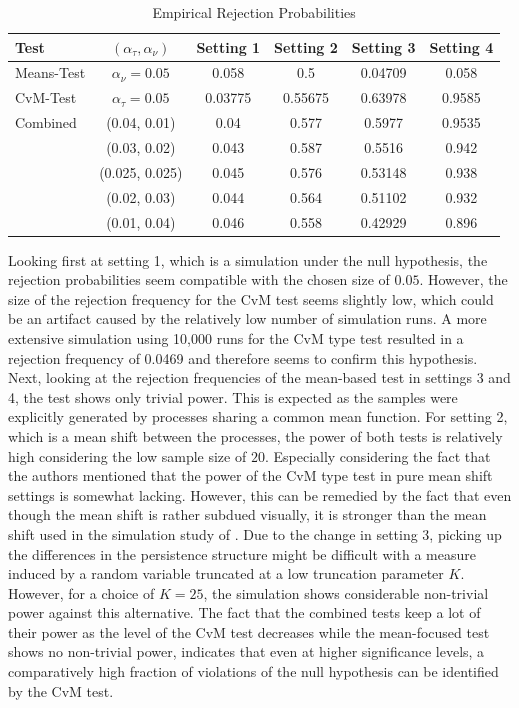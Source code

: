\documentclass[12pt, a4paper]{article}
\theoremstyle{MAstyle} \newtheorem{assumption}{Assumption}[section]
\theoremstyle{MAstyle} \newtheorem{definition}{Definition}[section]
\theoremstyle{MAstyle} \newtheorem{theorem}{Theorem}[section]
\begin{document}
		\begin{table}[H]
			\centering
			\begin{tabular}{l|c|cccc}\toprule
				\textbf{Test}	&$\left(\alpha_{\tau}, \alpha_{\nu}\right) $ &\textbf{Setting 1} &\textbf{Setting 2}	&\textbf{Setting 3} &\textbf{Setting 4}\\
				\midrule
				Means-Test		&$\alpha_{\nu} = 0.05$	& 0.058		& 0.5  	 	& 0.04709	& 0.058 	\\
				CvM-Test 		&$\alpha_{\tau} = 0.05$	& 0.03775	& 0.55675  	& 0.63978 	& 0.9585	\\
				\midrule	
				Combined		& (0.04, 0.01)			& 0.04		& 0.577  	& 0.5977 	& 0.9535	\\
								& (0.03, 0.02)			& 0.043		& 0.587  	& 0.5516 	& 0.942 	\\
								& (0.025, 0.025)		& 0.045		& 0.576  	& 0.53148 	& 0.938		\\
								& (0.02, 0.03)			& 0.044		& 0.564  	& 0.51102 	& 0.932		\\
								& (0.01, 0.04)			& 0.046		& 0.558  	& 0.42929 	& 0.896		\\
				\bottomrule
			\end{tabular}
			\caption{Empirical Rejection Probabilities}
		\end{table}
		Looking first at setting 1, which is a simulation under the null hypothesis, the rejection probabilities seem compatible with the chosen size of $0.05$. However, the size of the rejection frequency for the CvM test seems slightly low, which could be an artifact caused by the relatively low number of simulation runs. A more extensive simulation using 10,000 runs for the CvM type test resulted in a rejection frequency of 0.0469 and therefore seems to confirm this hypothesis.
		Next, looking at the rejection frequencies of the mean-based test in settings 3 and 4, the test shows only trivial power. This is expected as the samples were explicitly generated by processes sharing a common mean function. 
		For setting 2, which is a mean shift between the processes, the power of both tests is relatively high considering the low sample size of $20$. Especially considering the fact that the authors mentioned that the power of the CvM type test in pure mean shift settings is somewhat lacking. However, this can be remedied by the fact that even though the mean shift is rather subdued visually, it is stronger than the mean shift used in the simulation study of \cite{bugni_permutation_2021}.
		Due to the change in setting 3, picking up the differences in the persistence structure might be difficult with a measure induced by a random variable truncated at a low truncation parameter $K$. However, for a choice of $K = 25$, the simulation shows considerable non-trivial power against this alternative. The fact that the combined tests keep a lot of their power as the level of the CvM test decreases while the mean-focused test shows no non-trivial power, indicates that even at higher significance levels, a comparatively high fraction of violations of the null hypothesis can be identified by the CvM test.
\end{document}
